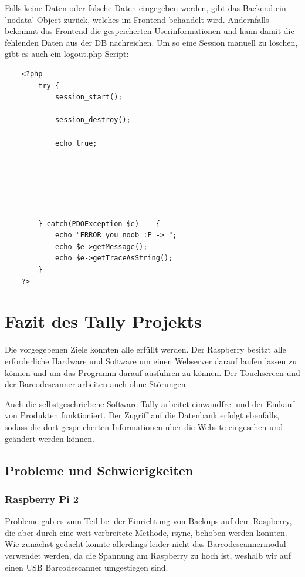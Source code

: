 \documentclass[11pt,a4paper]{article} %
\begin{document}
Falls keine Daten oder falsche Daten eingegeben werden, gibt das Backend ein 'nodata' Object zurück, welches im Frontend behandelt wird. Andernfalls bekommt das Frontend die gespeicherten Userinformationen und kann damit die fehlenden Daten aus der DB nachreichen.
Um so eine Session manuell zu löschen, gibt es auch ein logout.php Script:
\begin{frame}

\begin{lstlisting}
	<?php
		try {
			session_start();
		    
			session_destroy();
			
			echo true;
			
			
			
			
			

		} catch(PDOException $e) 	{
		    echo "ERROR you noob :P -> ";
		    echo $e->getMessage();
		    echo $e->getTraceAsString();
		}
	?>
 \end{lstlisting}
\end{frame}

		
		
\section{Fazit des Tally Projekts}
Die vorgegebenen Ziele konnten alle erfüllt werden. Der Raspberry besitzt alle erforderliche Hardware und Software um einen Webserver darauf laufen lassen zu können und um das Programm darauf ausführen zu können. Der Touchscreen und der Barcodescanner arbeiten auch ohne Störungen.
\par 
Auch die selbstgeschriebene Software Tally arbeitet einwandfrei und der Einkauf von Produkten funktioniert. Der Zugriff auf die Datenbank erfolgt ebenfalls, sodass die dort gespeicherten Informationen über die Website eingesehen und geändert werden können.

\subsection{Probleme und Schwierigkeiten}

\subsubsection{Raspberry Pi 2}
Probleme gab es zum Teil bei der Einrichtung von Backups auf dem Raspberry, die aber durch eine weit verbreitete Methode, rsync, behoben werden konnten. Wie zunächst gedacht konnte allerdings leider nicht das Barcodescannermodul verwendet werden, da die Spannung am Raspberry zu hoch ist, weshalb wir auf einen USB Barcodescanner umgestiegen sind.
\end{document}
